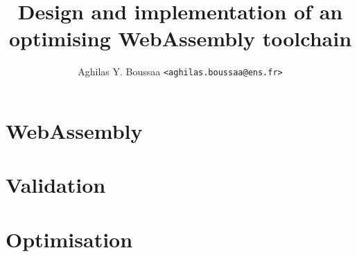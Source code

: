 \documentclass[11pt]{article}
\author{Aghilas Y. Boussaa \texttt{<aghilas.boussaa@ens.fr>}}
\title{Design and implementation of an optimising WebAssembly toolchain}
\begin{document}
\maketitle
\begin{abstract}
\end{abstract}
\section{WebAssembly}
\section{Validation}
\section{Optimisation}
\end{document}
